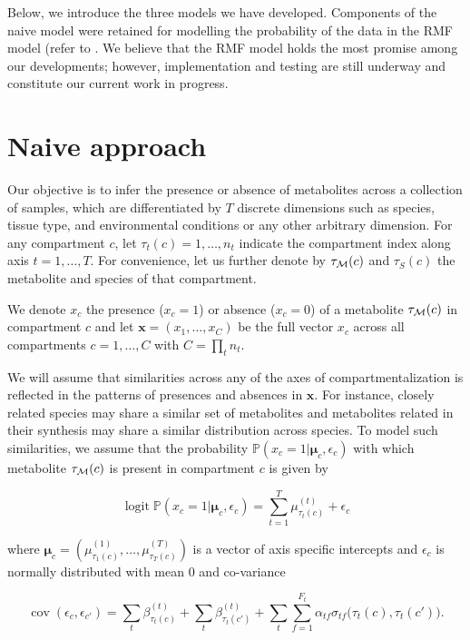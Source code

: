 \documentclass[
11pt, %
oneside, %
english, %
singlespacing, %
headsepline, %
chapterinoneline, %
]{MastersDoctoralThesis} %
\DeclareMathOperator{\logit}{logit}
\DeclareMathOperator{\cov}{cov}
\def\P{\mathbb{P}}
\def\x{\boldsymbol{x}}
\def\bmu{\boldsymbol{\mu}}
\def\M{{\cal M}}
\begin{document}
Below, we introduce the three models we have developed. Components of the naive model were retained for modelling the probability of the data in the RMF model (refer to . We believe that the RMF model holds the most promise among our developments; however, implementation and testing are still underway and constitute our current work in progress.

\section{Naive approach}\label{sec:methods:Naive approach}
Our objective is to infer the presence or absence of metabolites across a collection of samples, which are differentiated by $T$ discrete dimensions such as species, tissue type, and environmental conditions or any other arbitrary dimension. For any compartment $c$, let $\tau_t(c) = 1, \ldots, n_t$ indicate the compartment index along axis $t=1, \ldots, T$. For convenience, let us further denote by $\tau_\M(c)$ and $\tau_S(c)$ the metabolite and species of that compartment.

We denote $x_{c}$ the presence ($x_c=1$) or absence ($x_c=0$) of a metabolite $\tau_\M(c)$ in compartment $c$ and let $\x=(x_1, \ldots, x_C)$ be the full vector $x_c$ across all compartments $c=1, \ldots, C$ with $C=\prod_t n_t$.

We will assume that similarities across any of the axes of compartmentalization is reflected in the patterns of presences and absences in $\x$. For instance, closely related species may share a similar set of metabolites and  metabolites related in their synthesis may share a similar distribution across species. To model such similarities, we assume that the probability $\P(x_c=1|\bmu_c, \epsilon_c)$ with which metabolite $\tau_\M(c)$ is present in compartment $c$ is given by

\begin{equation}\label{eq:logit of X}
	\logit \P(x_c=1|\bmu_c, \epsilon_c) = \sum_{t=1}^{T} \mu^{(t)}_{\tau_t(c)} + \epsilon_{c}
\end{equation}

where $\bmu_c=(\mu^{(1)}_{\tau_1(c)}, \ldots, \mu^{(T)}_{\tau_T(c)})$ is a vector of axis specific intercepts and $\epsilon_{c}$ is normally distributed with mean 0 and co-variance

\begin{equation}
	\cov(\epsilon_c, \epsilon_{c'}) = \sum_t \beta^{(t)}_{\tau_t(c)} + \sum_t \beta^{(t)}_{\tau_t(c')} + \sum_t \sum_{f=1}^{F_t} \alpha_{tf} \sigma_{tf}\Big(\tau_t(c), \tau_t(c')\Big).
\end{equation}
\end{document}
